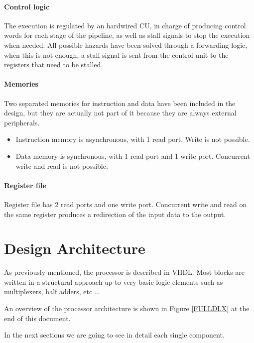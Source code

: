 \documentclass[12pt]{article}
\begin{document}
\paragraph{Control logic}
The execution is regulated by an hardwired CU, in charge of producing control words for each stage of the pipeline, as well as stall signals to stop the execution when needed.
All possible hazards have been solved through a forwarding logic, when this is not enough, a stall signal is sent from the control unit to the registers that need to be stalled.

\paragraph{Memories}
Two separated memories for instruction and data have been included in the design, but they are actually not part of it because they are always external peripherals.
\begin{itemize}
\item Instruction memory is asynchronous, with 1 read port. Write is not possible.
\item Data memory is synchronous, with 1 read port and 1 write port. Concurrent write and read is not possible.
\end{itemize}

\paragraph{Register file}
Register file has 2 read ports and one write port. Concurrent write and read on the same register produces a redirection of the input data to the output.

\section{Design Architecture}\label{Design}
As previously mentioned, the processor is described in VHDL. Most blocks are written in a structural approach up to very basic logic elements such as multiplexers, half adders, etc \ldots

An overview of the processor architecture is shown in Figure \ref{FULLDLX} at the end of this document.

In the next sections we are going to see in detail each single component.
\end{document}
